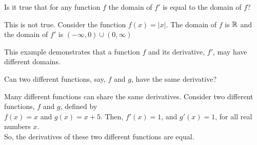 \documentclass{ximera}
\begin{document}
\begin{question}
  Is it true that for any function $f$ the domain of $f'$ is equal to the domain of $f$?
  \begin{prompt}
  \begin{multipleChoice}
  \end{multipleChoice}
  \begin{feedback}
  This is not true. 
  Consider the function $f(x)=|x|$. 
The domain of $f$ is $\mathbb R$ and the domain of $f'$ is $(-\infty,0)\cup(0,\infty)$


This example demonstrates that a function $f$ and its derivative, $f'$, may have different domains.
  \end{feedback}
  \end{prompt}
\end{question}

\begin{question}
  Can two different functions, say, $f$ and $g$, have the same derivative?
  \begin{prompt}
  \begin{multipleChoice}
  \end{multipleChoice}
  \begin{feedback}
    Many different functions can share the same derivatives.
    Consider two different functions, $f$ and $g$, defined by\\
    $f(x)=x$ and $g(x)=x+5$.
    Then, $f'(x)=1$, and $g'(x)=1$, for all real numbers $x$.\\
    So,  the derivatives of these two different functions are equal.

  \end{feedback}
  \end{prompt}
\end{question}


\begin{comment} 
\begin{question} 
    Which of the following computes the derivative, $f'(a)$?
    \begin{selectAll}
      \choice{$\lim_{h\to 0}\frac{(f(a)+h) - f(a)}{(a+h)-a}$}
      \choice[correct]{$\lim_{h\to 0}\frac{f(a+h) - f(a)}{(a+h)-a}$}
      \choice{$\lim_{h\to 0}\frac{(f(a)-h) - f(a)}{(a-h)-a}$}
      \choice[correct]{$\lim_{h\to 0}\frac{f(a-h) - f(a)}{(a-h)-a}$}
      \choice{$\lim_{h\to 0}\frac{f(a) - (f(a)+h)}{a-(a+h)}$}
      \choice[correct]{$\lim_{h\to 0}\frac{f(a) - f(a+h)}{a-(a+h)}$}
      \choice{$\lim_{h\to 0}\frac{f(a) - (f(a)-h)}{a-(a-h)}$}
      \choice[correct]{$\lim_{h\to 0}\frac{f(a) - f(a-h)}{a-(a-h)}$}
    \end{selectAll}
\end{question}	
\end{comment} 
\end{document}
